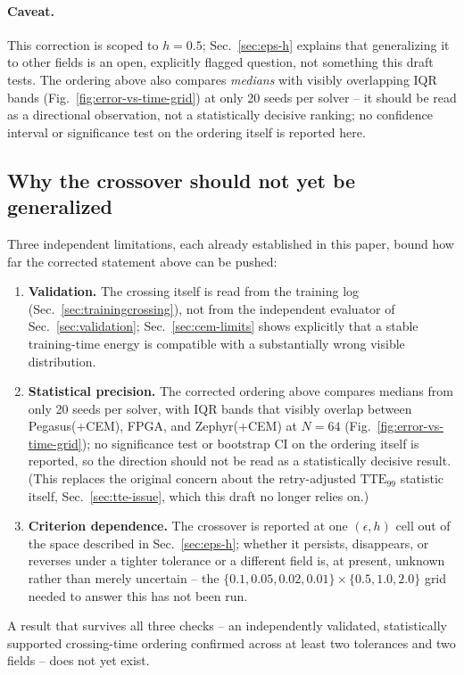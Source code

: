 \paragraph{Caveat.} This correction is scoped to $h=0.5$; Sec.~\ref{sec:eps-h} explains that generalizing it to other fields is an open, explicitly flagged question, not something this draft tests. The ordering above also compares \emph{medians} with visibly overlapping IQR bands (Fig.~\ref{fig:error-vs-time-grid}) at only 20 seeds per solver -- it should be read as a directional observation, not a statistically decisive ranking; no confidence interval or significance test on the ordering itself is reported here.

\subsection{Why the crossover should not yet be generalized}

Three independent limitations, each already established in this paper, bound how far the corrected statement above can be pushed:
\begin{enumerate}
\item \textbf{Validation.} The crossing itself is read from the training log (Sec.~\ref{sec:trainingcrossing}), not from the independent evaluator of Sec.~\ref{sec:validation}; Sec.~\ref{sec:cem-limits} shows explicitly that a stable training-time energy is compatible with a substantially wrong visible distribution.
\item \textbf{Statistical precision.} The corrected ordering above compares medians from only 20 seeds per solver, with IQR bands that visibly overlap between Pegasus(+CEM), FPGA, and Zephyr(+CEM) at $N=64$ (Fig.~\ref{fig:error-vs-time-grid}); no significance test or bootstrap CI on the ordering itself is reported, so the direction should not be read as a statistically decisive result. (This replaces the original concern about the retry-adjusted $\mathrm{TTE}_{99}$ statistic itself, Sec.~\ref{sec:tte-issue}, which this draft no longer relies on.)
\item \textbf{Criterion dependence.} The crossover is reported at one $(\epsilon,h)$ cell out of the space described in Sec.~\ref{sec:eps-h}; whether it persists, disappears, or reverses under a tighter tolerance or a different field is, at present, unknown rather than merely uncertain -- the $\{0.1,0.05,0.02,0.01\}\times\{0.5,1.0,2.0\}$ grid needed to answer this has not been run.
\end{enumerate}
A result that survives all three checks -- an independently validated, statistically supported crossing-time ordering confirmed across at least two tolerances and two fields -- does not yet exist. 

